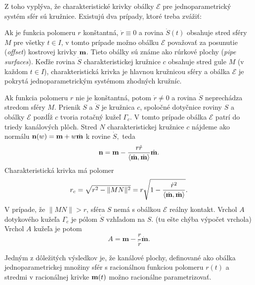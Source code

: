 Z toho vyplýva, že charakteristické krivky obálky $\mathcal{E}$ pre jednoparametrický systém sfér sú kružnice. Existujú dva prípady, ktoré treba zvážiť:

Ak je funkcia polomeru $r$ konštantná, $\dot{r} \equiv 0$ a rovina $\dot{S}(t)$ obsahuje stred sféry $M$ pre všetky $t \in I$, v tomto prípade možno obálku $\mathcal{E}$ považovať za posunutie (\textit{offset}) kostrovej krivky $\bold{m}$. Tieto obálky sú známe ako rúrkové plochy (\textit{pipe surfaces}). Keďže rovina $\dot{S}$ charakteristickej kružnice $c$ obsahuje stred gule $M$ (v každom $t \in I$), charakteristická krivka je hlavnou kružnicou sféry a obálka $\mathcal{E}$ je pokrytá jednoparametrickým systémom zhodných kružníc.

Ak funkcia polomeru $r$ nie je konštantná, potom $\dot{r} \neq 0$ a rovina $\dot{S}$  neprechádza stredom sféry $M$. Prienik $S$ a $\dot{S}$ je kružnica $c$, spoločné dotyčnice roviny $S$ a obálky $\mathcal{E}$ pozdĺž $c$ tvoria rotačný kužeľ $\Gamma_{c}$. V tomto prípade obálka $\mathcal{E}$ patrí do triedy kanálových plôch. 
Stred $N$ charakteristickej kružnice $c$ nájdeme ako normálu $\bold{n}(w) = \bold{m} + w\dot{\bold{m}}$ k rovine $\dot{S},$  
teda
$$ \bold{n} = \bold{m} - \frac{r \dot{r}}{\langle \dot{\bold{m}}, \dot{\bold{m}} \rangle} \dot{\bold{m}}.$$
Charakteristická krivka má polomer
$$ r_c = \sqrt{r^2 - \|MN\|^2} = r \sqrt{ 1 - \frac{\dot{r}^2}{\langle \dot{\bold{m}}, \dot{\bold{m}} \rangle}}. $$
V prípade, že $ \|MN\| > r$, sféra $S$ nemá s obálkou $\mathcal{E}$ reálny kontakt. Vrchol $A$ dotykového kužeľa $\Gamma_c$ je pólom $\dot{S}$ vzhľadom na $S$. (tu ešte chýba výpočet vrchola)
Vrchol $A$ kužeľa je potom 
$$
A = \mathbf{m} - \frac{r} {\dot{r}}\mathbf{\dot{m}}.
$$

Jedným z dôležitých výsledkov je, že kanálové plochy, definované ako obálka jednoparametrickej množiny sfér s racionálnou funkciou polomeru $r(t)$ a stredmi v racionálnej krivke $\bold{m}(t)$ možno racionálne parametrizovať. \cite{Pet97}

